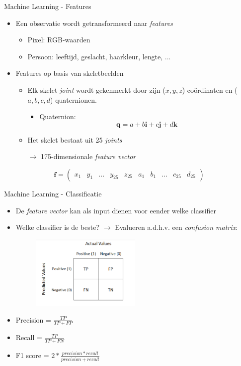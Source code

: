 \documentclass[]{beamer}
\begin{document}
	\begin{frame}{Machine Learning - Features}
		\begin{itemize}
			\item Een observatie wordt getransformeerd naar \textit{features}
			\begin{itemize}
				\item Pixel: RGB-waarden
				\item Persoon: leeftijd, geslacht, haarkleur, lengte, ...
			\end{itemize}
			\item Features op basis van skeletbeelden
			\begin{itemize}
				\item Elk skelet \textit{joint} wordt gekenmerkt door zijn ($x, y, z$) coördinaten en ($a, b, c, d$) quaternionen.
				\begin{itemize}
					\item Quaternion:
					$$\textbf{q} = a + b\textbf{i} + c\textbf{j} + d\textbf{k}$$
				\end{itemize}
				\item Het skelet bestaat uit 25 \textit{joints}
				\item[$\rightarrow$] 175-dimensionale \textit{feature vector}
				

			\end{itemize}
		
		\end{itemize}
		$$\textbf{f} = \begin{pmatrix}
		x_1 & y_1 &  ...&  y_{25} & z_{25} & a_1 & b_1 & ... & c_{25} & d_{25}
		\end{pmatrix}$$
	\end{frame}

	\begin{frame}{Machine Learning - Classificatie}
		\begin{itemize}
			\item De \textit{feature vector} kan als input dienen voor eender welke classifier
			\item Welke classifier is de beste? $\rightarrow$ Evalueren a.d.h.v. een \textit{confusion matrix}:
				\begin{figure}[ht]
					\centering
					\includegraphics[width=0.5\textwidth]{confusionmatrix}
				\end{figure}
				
				\item Precision = $\frac{TP}{TP + FP}$
				\item Recall = $\frac{TP}{TP + FN}$
				\item F1 score = $2*\frac{precision * recall}{precision + recall}$
				
		
		\end{itemize}
	\end{frame}
\end{document}
